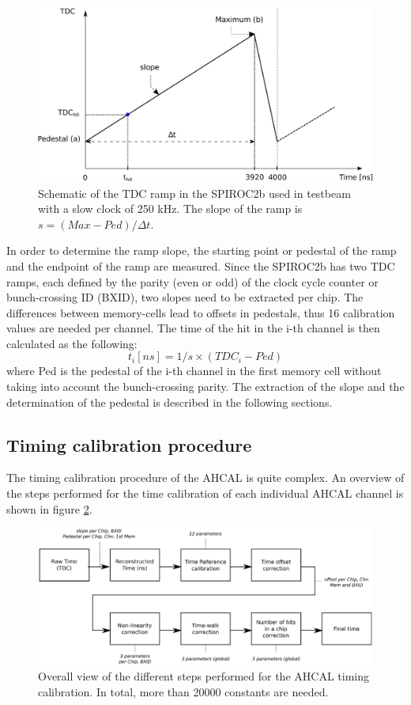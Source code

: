\documentclass{JINST}
\begin{document}
\begin{figure}[htbp!]
  \centering
  \includegraphics[width=0.9\linewidth]{fig/TDCRamp.eps}
  \caption{Schematic of the TDC ramp in the SPIROC2b used in testbeam with a slow clock of 250 kHz. The slope of the ramp is $s = (Max-Ped)/\Delta{}t$.} \label{fig:ConvertTime}
\end{figure}

In order to determine the ramp slope, the starting point or pedestal of the ramp and the endpoint of the ramp are measured. Since the SPIROC2b has two TDC ramps, each defined by the parity (even or odd) of the clock cycle counter or bunch-crossing ID (BXID), two slopes need to be extracted per chip. The differences between memory-cells lead to offsets in pedestals, thus 16 calibration values are needed per channel. The time of the hit in the i-th channel is then calculated as the following:
\begin{equation}
  t_{i} [ns] = 1/s \times (TDC_{i} - Ped)
\end{equation}
where Ped is the pedestal of the i-th channel in the first memory cell without taking into account the bunch-crossing parity. The extraction of the slope and the determination of the pedestal is described in the following sections.

\subsection{Timing calibration procedure}

The timing calibration procedure of the AHCAL is quite complex. An overview of the steps performed for the time calibration of each individual AHCAL channel is shown in figure \ref{fig:CalibOverview}.

\begin{figure}[htbp!]
  \centering
  \includegraphics[width=1\linewidth]{fig/TimeCalibOverview.eps}
  \caption{Overall view of the different steps performed for the AHCAL timing calibration. In total, more than 20000 constants are needed.} \label{fig:CalibOverview}
\end{figure}
\end{document}
